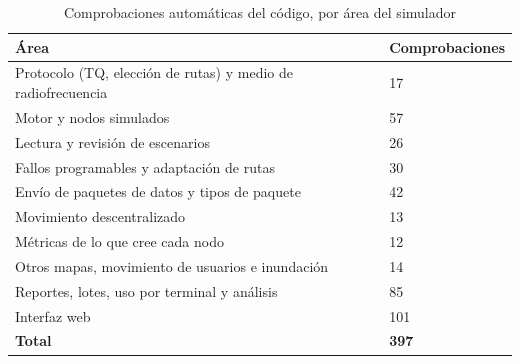 \begin{table}[htbp!]
    \centering
    \caption{Comprobaciones automáticas del código, por área del simulador}
    \label{tab:pruebas}
    \footnotesize
    \begin{tabular}{|p{9.2cm}|p{2.6cm}|}
        \hline
        \textbf{Área} & \textbf{Comprobaciones} \\
        \hline
        Protocolo (TQ, elección de rutas) y medio de radiofrecuencia & 17 \\
        \hline
        Motor y nodos simulados & 57 \\
        \hline
        Lectura y revisión de escenarios & 26 \\
        \hline
        Fallos programables y adaptación de rutas & 30 \\
        \hline
        Envío de paquetes de datos y tipos de paquete & 42 \\
        \hline
        Movimiento descentralizado & 13 \\
        \hline
        Métricas de lo que cree cada nodo & 12 \\
        \hline
        Otros mapas, movimiento de usuarios e inundación & 14 \\
        \hline
        Reportes, lotes, uso por terminal y análisis & 85 \\
        \hline
        Interfaz web & 101 \\
        \hline
        \textbf{Total} & \textbf{397} \\
        \hline
    \end{tabular}
\end{table}
